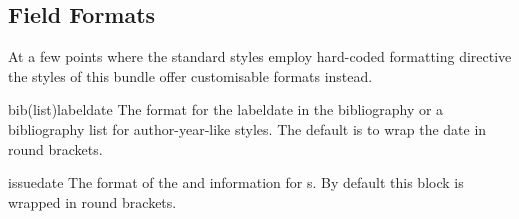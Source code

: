 \documentclass{ltxdockit}
\begin{document}

\subsection{Field Formats}
At a few points where the standard styles employ hard-coded formatting directive
the styles of this bundle offer customisable formats instead.

\begin{keymarglist}
\item[bib(list)labeldate] The format for the labeldate in the bibliography or
  a bibliography list for author-year-like styles. The default is to wrap the
  date in round brackets.
  \begin{tcolorbox}
  \togglefalse{bbx:doi}
  \end{tcolorbox}

\item[issuedate] The format of the  and 
  information for s. By default this block is wrapped in
  round brackets.
  \begin{tcolorbox}
  \makeatletter\bbx@opt@mergedate@false\makeatother
  \togglefalse{bbx:doi}
  \end{tcolorbox}
\end{keymarglist}

\end{document}
